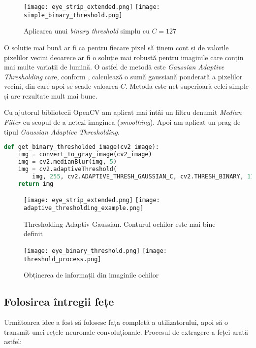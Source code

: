 \begin{figure}[h]
    \centering
    \texttt{[image: eye\_strip\_extended.png]}
    \texttt{[image: simple\_binary\_threshold.png]}
    \caption{Aplicarea unui \emph{binary threshold} simplu cu $C=127$}
\end{figure}

O soluție mai bună ar fi ca pentru fiecare pixel să ținem cont și de valorile pixelilor vecini deoarece ar fi o soluție mai robustă pentru imaginile care conțin mai multe variații de lumină.
O astfel de metodă este \emph{Gaussian Adaptive Thresholding} care, conform \cite{tutorial_py_thresholding}, calculează o sumă gaussiană ponderată a pixelilor vecini, din care apoi se scade valoarea $C$.
Metoda este net superioară celei simple și are rezultate mult mai bune.

Cu ajutorul bibliotecii OpenCV am aplicat mai întâi un filtru denumit \emph{Median Filter} cu scopul de a netezi imaginea (\emph{smoothing}).
Apoi am aplicat un prag de tipul \emph{Gaussian Adaptive Thresholding}.

\begin{lstlisting}[language=Python, caption=Aplicarea unui \emph{Gaussian Adaptive Thresholding}]
def get_binary_thresholded_image(cv2_image):
    img = convert_to_gray_image(cv2_image)
    img = cv2.medianBlur(img, 5)
    img = cv2.adaptiveThreshold(
        img, 255, cv2.ADAPTIVE_THRESH_GAUSSIAN_C, cv2.THRESH_BINARY, 11, 2)
    return img
\end{lstlisting}

\begin{figure}[h]
    \centering
    \texttt{[image: eye\_strip\_extended.png]}
    \texttt{[image: adaptive\_thresholding\_example.png]}
    \caption{Thresholding Adaptiv Gaussian. Conturul ochilor este mai bine definit}
\end{figure}

\begin{figure}[h]
    \centering
    \texttt{[image: eye\_binary\_threshold.png]}
    \texttt{[image: threshold\_process.png]}
    \caption{Obținerea de informații din imaginile ochilor}
\end{figure}

\subsection{Folosirea întregii fețe}
Următoarea idee a fost să folosesc fața completă a utilizatorului, apoi să o transmit unei rețele neuronale convoluționale.
Procesul de extragere a feței arată astfel:

